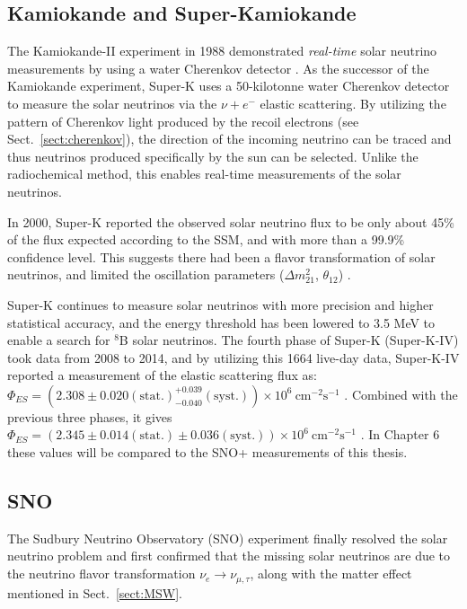 \subsection{Kamiokande and Super-Kamiokande}\label{sect:superKsolarnu}
The Kamiokande-II experiment in 1988 demonstrated \emph{real-time} solar neutrino measurements by using a water Cherenkov detector \cite{superKwebsite}. As the successor of the Kamiokande experiment, Super-K uses a 50-kilotonne water Cherenkov detector to measure the solar neutrinos via the $\nu+e^-$ elastic scattering. By utilizing the pattern of Cherenkov light produced by the recoil electrons (see Sect.~\ref{sect:cherenkov}), the direction of the incoming neutrino can be traced and thus neutrinos produced specifically by the sun can be selected. Unlike the radiochemical method, this enables real-time measurements of the solar neutrinos.

In 2000, Super-K reported the observed solar neutrino flux to be only about 45\% of the flux expected according to the SSM, and with more than a 99.9\% confidence level. This suggests there had been a flavor transformation of solar neutrinos, and limited the oscillation parameters ($\Delta m^2_{21}$, $\theta_{12}$) \cite{superKwebsite}. 

Super-K continues to measure solar neutrinos with more precision and higher statistical accuracy, and the energy threshold has been lowered to 3.5 MeV to enable a search for $^8$B solar neutrinos. The fourth phase of Super-K (Super-K-IV) took data from 2008 to 2014, and by utilizing this 1664 live-day data, Super-K-IV reported a measurement of the elastic scattering flux as: $\Phi_{ES}=(2.308\pm0.020\mathrm{(stat.)}^{+0.039}_{-0.040}\mathrm{(syst.)})\times 10^6~\mathrm{cm^{-2}s^{-1}}$ \cite{abe2016solar}. Combined with the previous three phases, it gives $\Phi_{ES}=(2.345\pm0.014\mathrm{(stat.)}\pm 0.036\mathrm{(syst.)})\times 10^6~\mathrm{cm^{-2}s^{-1}}$ \cite{abe2016solar}. In Chapter 6 these values will be compared to the SNO+ measurements of this thesis.

\subsection{SNO}

The Sudbury Neutrino Observatory (SNO) experiment finally resolved the solar neutrino problem and first confirmed that the missing solar neutrinos are due to the neutrino flavor transformation $\nu_e\to\nu_{\mu,\tau}$, along with the matter effect mentioned in Sect.~\ref{sect:MSW}.

